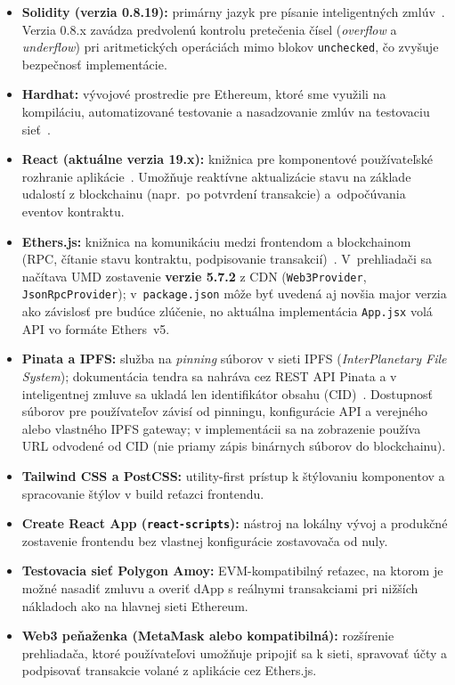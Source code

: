 \begin{itemize}
  \item \textbf{Solidity (verzia 0.8.19):} primárny jazyk pre písanie inteligentných
  zmlúv~\cite{solidityDocs}. Verzia 0.8.x zavádza predvolenú kontrolu pretečenia
  čísel (\emph{overflow} a \emph{underflow}) pri aritmetických operáciách mimo blokov
  \texttt{unchecked}, čo zvyšuje bezpečnosť implementácie.

  \item \textbf{Hardhat:} vývojové prostredie pre Ethereum, ktoré sme využili na
  kompiláciu, automatizované testovanie a nasadzovanie zmlúv na testovaciu
  sieť~\cite{hardhatDocs}.

  \item \textbf{React (aktuálne verzia 19.x):} knižnica pre komponentové používateľské
  rozhranie aplikácie~\cite{reactDocs}. Umožňuje reaktívne aktualizácie stavu na základe
  udalostí z blockchainu (napr.\ po potvrdení transakcie) a~odpočúvania eventov kontraktu.

  \item \textbf{Ethers.js:} knižnica na komunikáciu medzi frontendom a blockchainom
  (RPC, čítanie stavu kontraktu, podpisovanie transakcií)~\cite{ethersDocs}.
  V~prehliadači sa načítava UMD zostavenie \textbf{verzie 5.7.2} z CDN
  (\texttt{Web3Provider}, \texttt{JsonRpcProvider}); v~\texttt{package.json} môže byť
  uvedená aj novšia major verzia ako závislosť pre budúce zlúčenie, no aktuálna
  implementácia \texttt{App.jsx} volá API vo formáte Ethers~v5.

  \item \textbf{Pinata a IPFS:} služba na \emph{pinning} súborov v sieti IPFS
  (\emph{InterPlanetary File System}); dokumentácia tendra sa nahráva cez REST API
  Pinata a v inteligentnej zmluve sa ukladá len identifikátor obsahu
  (CID)~\cite{pinataDocs}. Dostupnosť súborov pre používateľov závisí od pinningu,
  konfigurácie API a verejného alebo vlastného IPFS gateway; v implementácii sa na
  zobrazenie používa URL odvodené od CID (nie priamy zápis binárnych súborov do
  blockchainu).

  \item \textbf{Tailwind CSS a PostCSS:} utility-first prístup k štýlovaniu komponentov
  a spracovanie štýlov v build reťazci frontendu.

  \item \textbf{Create React App (\texttt{react-scripts}):} nástroj na lokálny vývoj
  a produkčné zostavenie frontendu bez vlastnej konfigurácie zostavovača od nuly.

  \item \textbf{Testovacia sieť Polygon Amoy:} EVM-kompatibilný reťazec, na ktorom je
  možné nasadiť zmluvu a overiť dApp s reálnymi transakciami pri nižších nákladoch
  ako na hlavnej sieti Ethereum.

  \item \textbf{Web3 peňaženka (MetaMask alebo kompatibilná):} rozšírenie prehliadača,
  ktoré používateľovi umožňuje pripojiť sa k sieti, spravovať účty a podpisovať
  transakcie volané z aplikácie cez Ethers.js.
\end{itemize}

